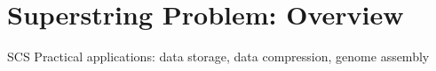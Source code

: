 \section{Superstring Problem: Overview}


\begin{frame}{SCS}
\pause
Practical applications: data
storage, data compression, genome assembly
\end{frame}

%
%
%
%
%
%   
%   
%   
%     
%
